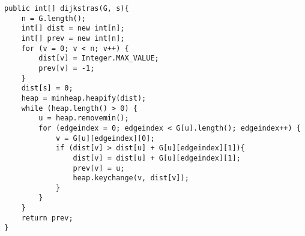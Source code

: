 \begin{solution}
\begin{lstlisting}
public int[] dijkstras(G, s){
    n = G.length();
    int[] dist = new int[n];
    int[] prev = new int[n];
    for (v = 0; v < n; v++) {
        dist[v] = Integer.MAX_VALUE;
        prev[v] = -1;
    }
    dist[s] = 0;
    heap = minheap.heapify(dist);
    while (heap.length() > 0) {
        u = heap.removemin();
        for (edgeindex = 0; edgeindex < G[u].length(); edgeindex++) {
            v = G[u][edgeindex][0];
            if (dist[v] > dist[u] + G[u][edgeindex][1]){
                dist[v] = dist[u] + G[u][edgeindex][1];
                prev[v] = u;
                heap.keychange(v, dist[v]);
            }
        }
    }
    return prev;   
}
\end{lstlisting}
\end{solution}